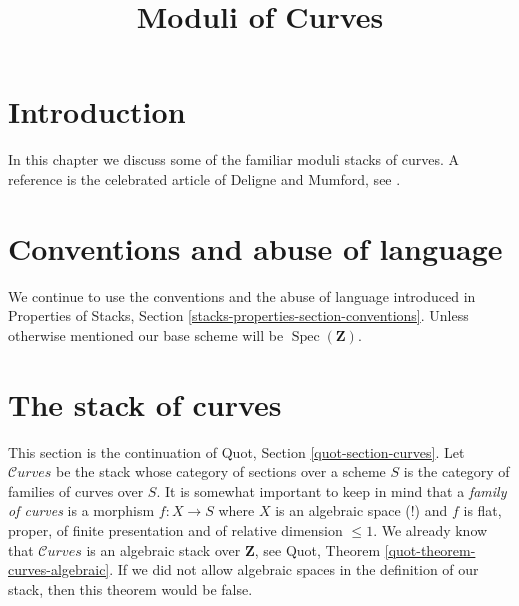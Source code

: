 \documentclass{stacks-project}
\theoremstyle{plain}
\theoremstyle{definition}
\theoremstyle{remark}
\numberwithin{equation}{subsection}
\def\Spec{\mathop{\mathrm{Spec}}}
\def\Curvesstack{\mathcal{C}\!\mathit{urves}}
\begin{document}
\title{Moduli of Curves}

\maketitle

\label{section-phantom}

\tableofcontents




\section{Introduction}
\label{section-introduction}

\noindent
In this chapter we discuss some of the familiar moduli stacks of curves.
A reference is the celebrated article of Deligne and Mumford, see \cite{DM}.




\section{Conventions and abuse of language}
\label{section-conventions}

\noindent
We continue to use the conventions and the abuse of language
introduced in
Properties of Stacks, Section \ref{stacks-properties-section-conventions}.
Unless otherwise mentioned our base scheme will be $\Spec(\mathbf{Z})$.







\section{The stack of curves}
\label{section-stack-curves}

\noindent
This section is the continuation of Quot, Section \ref{quot-section-curves}.
Let $\Curvesstack$ be the stack whose category of sections over a
scheme $S$ is the category of families of curves over $S$.
It is somewhat important to keep in mind that a
{\it family of curves} is a morphism $f : X \to S$ where $X$
is an algebraic space (!) and $f$ is flat, proper, of finite presentation
and of relative dimension $\leq 1$.
We already know that $\Curvesstack$ is an
algebraic stack over $\mathbf{Z}$, see Quot, Theorem
\ref{quot-theorem-curves-algebraic}.
If we did not allow algebraic spaces in the definition of
our stack, then this theorem would be false.
\end{document}
